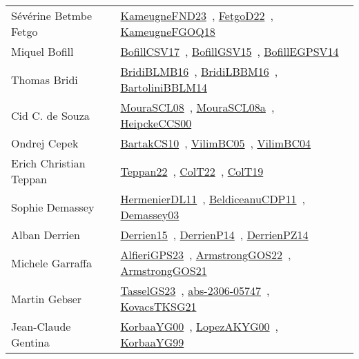 {\begin{longtable}{p{4cm}p{20cm}}
S{\'{e}}v{\'{e}}rine Betmbe Fetgo & \href{papers/KameugneFND23.pdf}{KameugneFND23}~\cite{KameugneFND23}, \href{articles/FetgoD22.pdf}{FetgoD22}~\cite{FetgoD22}, \href{papers/KameugneFGOQ18.pdf}{KameugneFGOQ18}~\cite{KameugneFGOQ18}\\
Miquel Bofill & \href{papers/BofillCSV17.pdf}{BofillCSV17}~\cite{BofillCSV17}, \href{papers/BofillGSV15.pdf}{BofillGSV15}~\cite{BofillGSV15}, \href{papers/BofillEGPSV14.pdf}{BofillEGPSV14}~\cite{BofillEGPSV14}\\
Thomas Bridi & \href{articles/BridiBLMB16.pdf}{BridiBLMB16}~\cite{BridiBLMB16}, \href{papers/BridiLBBM16.pdf}{BridiLBBM16}~\cite{BridiLBBM16}, \href{papers/BartoliniBBLM14.pdf}{BartoliniBBLM14}~\cite{BartoliniBBLM14}\\
Cid C. de Souza & \href{papers/MouraSCL08.pdf}{MouraSCL08}~\cite{MouraSCL08}, \href{papers/MouraSCL08a.pdf}{MouraSCL08a}~\cite{MouraSCL08a}, \href{articles/HeipckeCCS00.pdf}{HeipckeCCS00}~\cite{HeipckeCCS00}\\
Ondrej Cepek & \href{articles/BartakCS10.pdf}{BartakCS10}~\cite{BartakCS10}, \href{articles/VilimBC05.pdf}{VilimBC05}~\cite{VilimBC05}, \href{papers/VilimBC04.pdf}{VilimBC04}~\cite{VilimBC04}\\
Erich Christian Teppan & \href{papers/Teppan22.pdf}{Teppan22}~\cite{Teppan22}, \href{articles/ColT22.pdf}{ColT22}~\cite{ColT22}, \href{papers/ColT19.pdf}{ColT19}~\cite{ColT19}\\
Sophie Demassey & \href{papers/HermenierDL11.pdf}{HermenierDL11}~\cite{HermenierDL11}, \href{articles/BeldiceanuCDP11.pdf}{BeldiceanuCDP11}~\cite{BeldiceanuCDP11}, \href{}{Demassey03}~\cite{Demassey03}\\
Alban Derrien & \href{}{Derrien15}~\cite{Derrien15}, \href{papers/DerrienP14.pdf}{DerrienP14}~\cite{DerrienP14}, \href{papers/DerrienPZ14.pdf}{DerrienPZ14}~\cite{DerrienPZ14}\\
Michele Garraffa & \href{articles/AlfieriGPS23.pdf}{AlfieriGPS23}~\cite{AlfieriGPS23}, \href{papers/ArmstrongGOS22.pdf}{ArmstrongGOS22}~\cite{ArmstrongGOS22}, \href{papers/ArmstrongGOS21.pdf}{ArmstrongGOS21}~\cite{ArmstrongGOS21}\\
Martin Gebser & \href{papers/TasselGS23.pdf}{TasselGS23}~\cite{TasselGS23}, \href{articles/abs-2306-05747.pdf}{abs-2306-05747}~\cite{abs-2306-05747}, \href{papers/KovacsTKSG21.pdf}{KovacsTKSG21}~\cite{KovacsTKSG21}\\
Jean{-}Claude Gentina & \href{articles/KorbaaYG00.pdf}{KorbaaYG00}~\cite{KorbaaYG00}, \href{articles/LopezAKYG00.pdf}{LopezAKYG00}~\cite{LopezAKYG00}, \href{papers/KorbaaYG99.pdf}{KorbaaYG99}~\cite{KorbaaYG99}\\

\end{longtable}}
